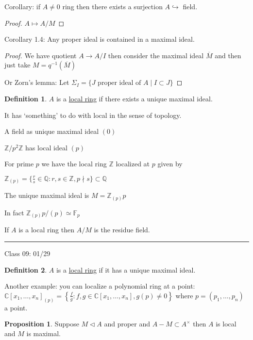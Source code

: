 \documentclass{article}
\theoremstyle{definition}
\newtheorem{definition}{Definition}
\newtheorem{proposition}{Proposition}
\begin{document}
Corollary: if \(A\neq 0\) ring then there exists a surjection \(A \hookrightarrow \) field.

\begin{proof}
    \(A \mapsto A / M\) 
\end{proof}

Corollary 1.4: Any proper ideal is contained in a maximal ideal.

\begin{proof}
    We have quotient \(A \to A / I\) then consider the maximal ideal \(\overline{M} \) and then just take \(M = q^{-1}(\overline{M} )\) 

    Or Zorn's lemma: Let \(\Sigma _I = \{ J \text{ proper ideal of } A \mid I \subset J \} \) 

\end{proof}

\begin{definition}
    \(A\) is a \underline{local ring} if there exists a unique maximal ideal.
\end{definition}

It has `something' to do with local in the sense of topology.

A field as unique maximal ideal \((0)\) 

\(\mathbb{Z} / p^2 \mathbb{Z} \) has local ideal \((p)\) 

For prime \(p\) we have the local ring \(\mathbb{Z}\) localized at \(p\) given by

\(\mathbb{Z} _{(p)} = \{ \frac{r}{s}\in \mathbb{Q} : r,s\in \mathbb{Z} , p\nmid s \} \subset \mathbb{Q} \) 

The unique maximal ideal is \(M = \mathbb{Z} _{(p)}p\) 

In fact \(\mathbb{Z}_{(p)}p / (p) \simeq \mathbb{F} _p\) 

If \(A\) is a local ring then \(A / M\) is the residue field.

\hfil
\hrule

Class 09: 01/29

\begin{definition}
    \(A\) is a \underline{local ring} if it has a unique maximal ideal.
\end{definition}

Another example: you can localize a polynomial ring at a point: \(\mathbb{C} [x_1, \dots, x_n ]_{(p)}= \left\{ \frac{f}{g} : f,g\in\mathbb{C} [x_1, \dots, x_n ],g(p) \neq 0 \right\} \) where \(p=(p_1, \dots, p_n )\) a point. 

\begin{proposition}
    Suppose \(M \triangleleft A\) and proper and \(A - M \subset A^\times \) then \(A\) is local and \(M\) is maximal. 
\end{proposition}
\end{document}
